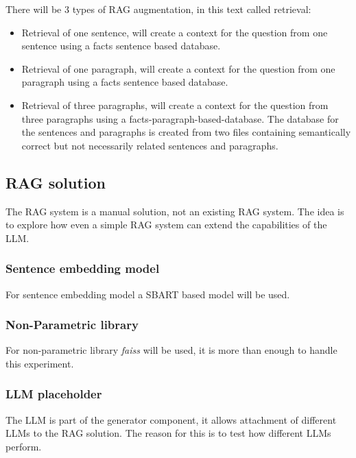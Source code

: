 \documentclass{wseas}
\begin{document}
There will be 3 types of RAG augmentation, in this text called
retrieval:

\begin{itemize}
\item
  Retrieval of one sentence, will create a context for the question from
  one sentence using a facts sentence based database.
\item
  Retrieval of one paragraph, will create a context for the question
  from one paragraph using a facts sentence based database.
\item
  Retrieval of three paragraphs, will create a context for the question
  from three paragraphs using a facts-paragraph-based-database. The
  database for the sentences and paragraphs is created from two files
  containing semantically correct but not necessarily related sentences
  and paragraphs.
\end{itemize}

\newpage

\subsection{RAG solution}

The RAG system is a manual solution, not an existing RAG system.
The idea is to explore how even a simple RAG system can extend the
capabilities of the LLM.

\subsubsection{Sentence embedding model}

For sentence embedding model a SBART based model will be used.

\subsubsection{Non-Parametric library}

For non-parametric library \textit{faiss} will be used, it is more than
enough to handle this experiment.

\subsubsection{LLM placeholder}

The LLM is part of the generator component, it allows attachment of 
different LLMs to the RAG solution. The reason for this is to test 
how different LLMs perform.
\end{document}
